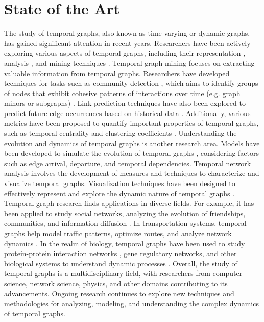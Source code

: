 \section{State of the Art}
\label{ch:prelimiaries:state-of-the-art}
The study of temporal graphs, also known as time-varying or dynamic graphs, has gained significant attention in recent years. Researchers have been actively exploring various aspects of temporal graphs, including their representation \cite{Holme_2012}, analysis \cite{DBLP:journals/corr/Erlebach0K15}\cite{DBLP:journals/corr/Michail15}, and mining techniques \cite{temporal-mining-oettershagen2022tglib}. Temporal graph mining focuses on extracting valuable information from temporal graphs.
Researchers have developed techniques for tasks such as community detection \cite{temporal-comunity-detection-8861143}, which aims to identify groups of nodes that exhibit cohesive patterns of interactions over time (e.g. graph minors or subgraphs) \cite{arrighi2022multiparameter}.
Link prediction techniques have also been explored to predict future edge occurrences based on historical data \cite{temporalLinkPrediction}.
Additionally, various metrics have been proposed to quantify important properties of temporal graphs, such as temporal centrality and clustering coefficients \cite{temporalClusterCoefficient}.
Understanding the evolution and dynamics of temporal graphs is another research area.
Models have been developed to simulate the evolution of temporal graphs \cite{temporalEvolution}, considering factors such as edge arrival, departure, and temporal dependencies.
Temporal network analysis involves the development of measures and techniques to characterize and visualize temporal graphs. Visualization techniques have been designed to effectively represent and explore the dynamic nature of temporal graphs \cite{kerracher2014design}.
Temporal graph research finds applications in diverse fields.
For example, it has been applied to study social networks, analyzing the evolution of friendships, communities, and information diffusion \cite{temporal-friends}\cite{temporal-information-diffusion}.
In transportation systems, temporal graphs help model traffic patterns, optimize routes, and analyze network dynamics \cite{tang2009temporal}.
In the realm of biology, temporal graphs have been used to study protein-protein interaction networks \cite{fu2022dppin}, gene regulatory networks, and other biological systems to understand dynamic processes \cite{dibrita2022temporal}.
Overall, the study of temporal graphs is a multidisciplinary field, with researchers from computer science, network science, physics, and other domains contributing to its advancements.
Ongoing research continues to explore new techniques and methodologies for analyzing, modeling, and understanding the complex dynamics of temporal graphs.


